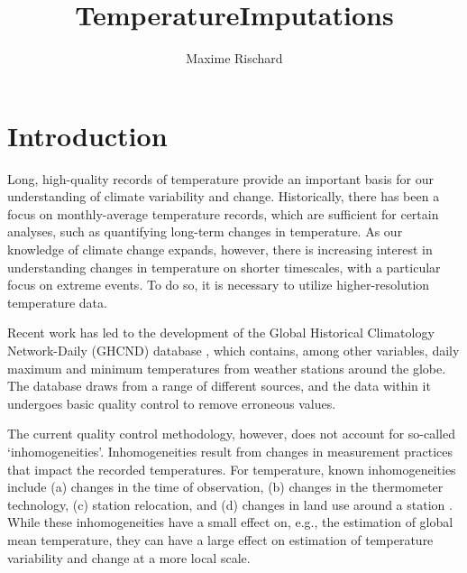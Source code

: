 \documentclass[letter]{article}
\title{TemperatureImputations}
\author{Maxime Rischard}
\begin{document}
    
    
    
    \maketitle
    
    
	\tableofcontents


    







    	\section{Introduction}\label{introduction}
    

Long, high-quality records of temperature provide an important basis for our understanding of climate variability and change. Historically, there has been a focus on monthly-average temperature records, which are sufficient for certain analyses, such as quantifying long-term changes in temperature. As our knowledge of climate change expands, however, there is increasing interest in understanding changes in temperature on shorter timescales, with a particular focus on extreme events. To do so, it is necessary to utilize higher-resolution temperature data. 

Recent work has led to the development of the Global Historical Climatology Network-Daily (GHCND) database \citep{menne2012overview}, which contains, among other variables, daily maximum and minimum temperatures from weather stations around the globe. The database draws from a range of different sources, and the data within it undergoes basic quality control to remove erroneous values. 

The current quality control methodology, however, does not account for so-called `inhomogeneities'. Inhomogeneities result from changes in measurement practices that impact the recorded temperatures. For temperature, known inhomogeneities include (a) changes in the time of observation, (b) changes in the thermometer technology, (c) station relocation, and (d) changes in land use around a station \citep{menne2009us}. While these inhomogeneities have a small effect on, e.g., the estimation of global mean temperature, they can have a large effect on estimation of temperature variability and change at a more local scale.
\end{document}
